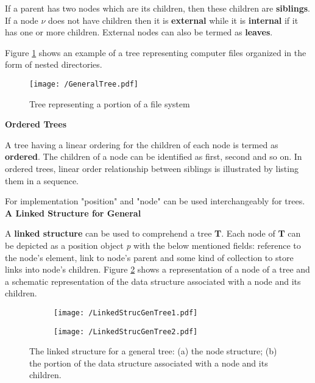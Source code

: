 		If a parent has two nodes which are its children, then these children are \textbf{siblings}. If a node \textit{$\nu$} does not have children then it is \textbf{external} while it is \textbf{internal} if it has one or more children. External nodes can also be termed as \textbf{leaves}.
		
		Figure \ref{fig:GeneralTree} shows an example of a tree representing computer files organized in the form of nested directories. 
		
		\begin{figure}[h]
			\centering
			\texttt{[image: /GeneralTree.pdf]}
			\caption{Tree representing a portion of a file system}
			\label{fig:GeneralTree}
		\end{figure}
		
		\textbf{Ordered Trees}
		
		A tree having a linear ordering for the children of each node is termed as \textbf{ordered}. The children of a node  can be identified as first, second and so on. In ordered trees, linear order relationship between siblings is illustrated by listing them in a sequence.
		
		For implementation "position" and "node" can be used interchangeably for trees. \\
		
		\textbf{A Linked Structure for General}
		
		A \textbf{linked structure} can be used to comprehend a tree \textbf{T}. Each node of \textbf{T} can be depicted as a position object \textit{p} with the below mentioned fields:
		reference to the node's element, link to node's parent and some kind of collection to store links into node's children.  Figure \ref{fig:LinkedStrucGenTree} shows a representation of  a node of a tree and a schematic representation of the data structure associated with a node and its children. \\
		
		\begin{figure}[h]
			\centering
		    \begin{subfigure}[b]{0.33\textwidth}
			    \texttt{[image: /LinkedStrucGenTree1.pdf]}
				\centering
		        \caption{}
		    \end{subfigure} 
		    \begin{subfigure}[b]{0.66\textwidth}    
			    \texttt{[image: /LinkedStrucGenTree2.pdf]}
				\centering    
			 \caption{}
		    \end{subfigure} 
		    \caption{The linked structure for a general tree: (a) the node structure; (b) the portion of the data structure associated with a node and its children.}
		    \label{fig:LinkedStrucGenTree}
		\end{figure}
		
